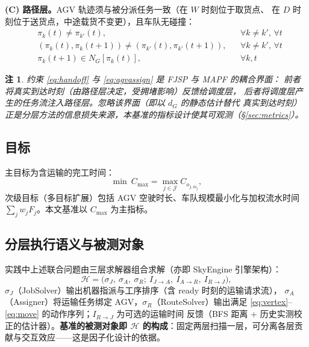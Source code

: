 \documentclass[UTF8,12pt,a4paper]{ctexart}
\newtheorem{remark}{注}
\newcommand{\Cmax}{C_{\max}}
\begin{document}
\textbf{(C) 路径层。}AGV 轨迹须与被分派任务一致（在 $W$ 时刻位于取货点、
在 $D$ 时刻位于送货点，中途载货不变更），且车队无碰撞：
\begin{align}
& \pi_k(t)\ne \pi_{k'}(t), && \forall k\ne k',\, \forall t \label{eq:vertex}\\
& (\pi_k(t),\pi_k(t{+}1))\ne(\pi_{k'}(t),\pi_{k'}(t{+}1)), && \forall k\ne k',\, \forall t \label{eq:swap}\\
& \pi_k(t{+}1)\in N_G[\pi_k(t)], && \forall k,t \label{eq:move}
\end{align}

\begin{remark}
约束 \eqref{eq:handoff} 与 \eqref{eq:agvassign} 是 FJSP 与 MAPF 的耦合界面：
前者将\emph{真实}到达时刻（由路径层决定，受拥堵影响）反馈给调度层，
后者将调度层产生的任务流注入路径层。忽略该界面（即以 $d_G$ 的静态估计替代
真实到达时刻）正是分层方法的信息损失来源，本基准的指标设计使其可观测（\S\ref{sec:metrics}）。
\end{remark}

\subsection{目标}\label{ssec:objective}

主目标为含运输的完工时间：
\begin{equation}
\min\ \Cmax = \max_{j\in\mathcal{J}} C_{o_{j,m_j}},
\end{equation}
次级目标（多目标扩展）包括 AGV 空驶时长、车队规模最小化与加权流水时间
$\sum_j w_j F_j$。本文基准以 $\Cmax$ 为主指标。

\subsection{分层执行语义与被测对象}\label{ssec:hier}

实践中上述联合问题由三层求解器组合求解（亦即 SkyEngine 引擎架构）：
\begin{equation}
\mathcal{H} = \big(\sigma_J,\ \sigma_A,\ \sigma_R;\ I_{J\to A},\ I_{A\to R},\ I_{R\to J}\big),
\end{equation}
$\sigma_J$（JobSolver）输出机器指派与工序排序（含 ready 时刻的运输请求流），
$\sigma_A$（Assigner）将运输任务绑定 AGV，$\sigma_R$（RouteSolver）输出满足
\eqref{eq:vertex}--\eqref{eq:move} 的动作序列；$I_{R\to J}$ 为可选的运输时间
反馈（BFS 距离 + 历史实测校正的估计器）。\textbf{基准的被测对象即 $\mathcal{H}$
的构成}：固定两层扫描一层，可分离各层贡献与交互效应——这是因子化设计的依据。
\end{document}
